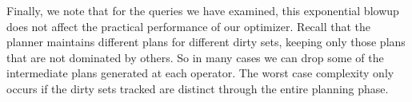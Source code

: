 Finally, we note that for the queries we have examined, this exponential blowup does not affect the practical performance of our optimizer.
Recall that the planner maintains different plans for different dirty sets, keeping only those plans that are not dominated by others.
So in many cases we can drop some of the intermediate plans generated at each operator.
The worst case complexity only occurs if the dirty sets tracked are distinct through the entire planning phase.


